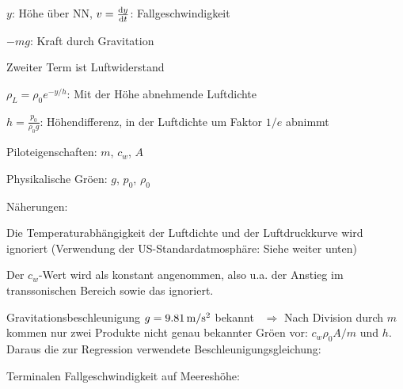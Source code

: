 \begin{landscape}
\begin{center}
\parbox{1.2\textwidth}{
\bi
\item $y$: H\"ohe \"uber NN, $v=\frac{{\rm d} y}{{\rm d} t}$: Fallgeschwindigkeit\\[-2.5em]
\item $-mg$: Kraft durch Gravitation\\[-2.5em]
\item Zweiter Term ist Luftwiderstand\\[-2.5em]
\item $\rho_L=\rho_0 e^{-y/h}$: Mit der H\"ohe abnehmende Luftdichte\\[-2.5em]
\item $h=\frac{p_0}{\rho_0g}$: H\"ohendifferenz, in der Luftdichte um
  Faktor $1/e$ abnimmt\\[-2.5em]
\item Piloteigenschaften: $m$, $c_w$, $A$\\[-2.5em]
\item Physikalische Gr\"o\3en: $g$, $p_0$, $\rho_0$
\ei
}

N\"aherungen:
\bi
\item Die Temperaturabh\"angigkeit der Luftdichte und der
  Luftdruckkurve wird ignoriert (Verwendung der
  US-Standardatmosph\"are: Siehe weiter unten) \\[-3em]
\item Der $c_w$-Wert wird als konstant angenommen, also u.a. der
  Anstieg im transsonischen Bereich sowie das 
 ignoriert.\\[-3em]
\ei



\newpage

\vspace{1em}
Gravitationsbeschleunigung $g=\unit[9.81]{m/s^2}$ bekannt 
\ $\Rightarrow$ Nach Division durch $m$ kommen nur zwei Produkte nicht
genau bekannter Gr\"o\3en vor: $c_w\rho_0 A/m$ und $h$. Daraus die
zur Regression verwendete
Beschleunigungsgleichung:
\vspace{1ex}

\vspace{1em}

Terminalen Fallgeschwindigkeit auf Meeresh\"ohe:
\vspace{-2em}


\end{center}
\end{landscape}
